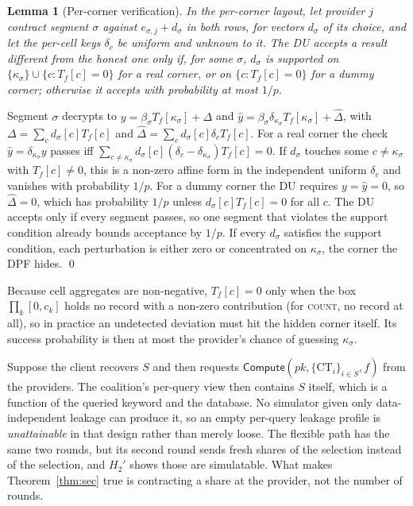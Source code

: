 \documentclass[a4paper,fleqn]{cas-sc}
\newtheorem{lemma}{Lemma}
\newcommand{\Compute}{\mathsf{Compute}}
\begin{document}
\begin{lemma}[Per-corner verification]
\label{lem:cornermac}
In the per-corner layout, let provider $j$ contract segment $\sigma$ against
$e_{\sigma,j}+d_\sigma$ in both rows, for vectors $d_\sigma$ of its choice,
and let the per-cell keys $\delta_c$ be uniform and unknown to it. The DU
accepts a result different from the honest one only if, for some $\sigma$,
$d_\sigma$ is supported on $\{\kappa_\sigma\}\cup\{c: T_f[c]=0\}$ for a real
corner, or on $\{c: T_f[c]=0\}$ for a dummy corner; otherwise it accepts with
probability at most $1/p$.
\end{lemma}
\begin{pf}
Segment $\sigma$ decrypts to $y=\beta_\sigma T_f[\kappa_\sigma]+\Delta$ and
$\hat y=\beta_\sigma\delta_{\kappa_\sigma}T_f[\kappa_\sigma]+\hat\Delta$, with
$\Delta=\sum_c d_\sigma[c]T_f[c]$ and $\hat\Delta=\sum_c
d_\sigma[c]\delta_cT_f[c]$. For a real corner the check $\hat
y=\delta_{\kappa_\sigma}y$ passes iff
$\sum_{c\ne\kappa_\sigma}d_\sigma[c](\delta_c-\delta_{\kappa_\sigma})T_f[c]=0$.
If $d_\sigma$ touches some $c\ne\kappa_\sigma$ with $T_f[c]\ne0$, this is a
non-zero affine form in the independent uniform $\delta_c$ and vanishes with
probability $1/p$. For a dummy corner the DU requires $y=\hat y=0$, so
$\hat\Delta=0$, which has probability $1/p$ unless $d_\sigma[c]T_f[c]=0$ for all
$c$. The DU accepts only if every segment passes, so one segment that
violates the support condition already bounds acceptance by $1/p$. If every
$d_\sigma$
satisfies the support condition, each perturbation is either zero or
concentrated on $\kappa_\sigma$, the corner the DPF hides. \qed
\end{pf}
Because cell aggregates are non-negative, $T_f[c]=0$ only when the box
$\prod_k[0,c_k]$ holds no record with a non-zero contribution (for
\textsc{count}, no record at all), so in practice an undetected deviation must
hit the hidden corner itself. Its success probability is then at most the provider's chance of
guessing $\kappa_\sigma$.

\begin{remark}
\label{rem:v1}
Suppose the client recovers $S$ and then requests
$\Compute(pk,\{\text{CT}_i\}_{i\in S},f)$ from the providers. The coalition's
per-query view then contains $S$ itself, which is a function of the queried
keyword and the database. No simulator given only data-independent leakage can
produce it, so an empty per-query leakage profile is \emph{unattainable} in
that design rather than merely loose. The flexible path has the same two
rounds, but its second round sends fresh shares of the selection instead of
the selection, and $H_2'$ shows those are simulatable. What makes
Theorem~\ref{thm:sec} true is contracting a share at the provider, not the
number of rounds.
\end{remark}
\end{document}
